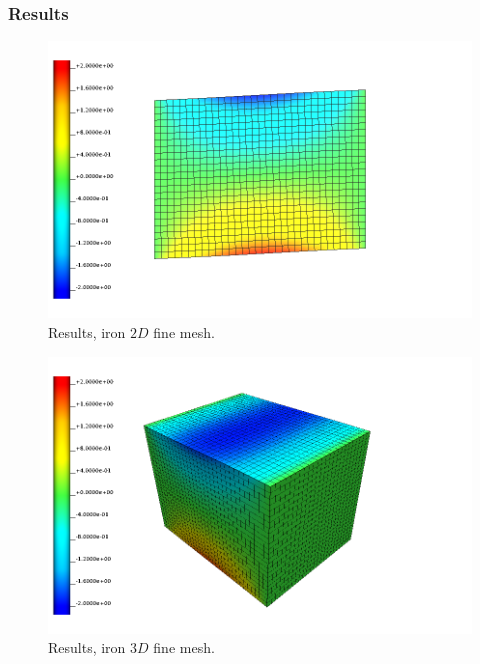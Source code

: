 \subsubsection{Results}
%
\begin{figure}[h!]
    \centering 
    \includegraphics[width=\columnwidth]{examples/example-0102/doc/figures/l160x120x000_n32x24x00_i1_s0_shear.png} 
    \caption{Results, iron $2D$ fine mesh.}
    \label{example-0101-iron-2D-fig}
\end{figure}
%
\begin{figure}[h!]
    \centering 
    \includegraphics[width=\columnwidth]{examples/example-0102/doc/figures/l160x120x120_n32x24x24_i1_s0_shear.png} 
    \caption{Results, iron $3D$ fine mesh.}
    \label{example-0101-iron-3D-fig}
\end{figure}
%
%
